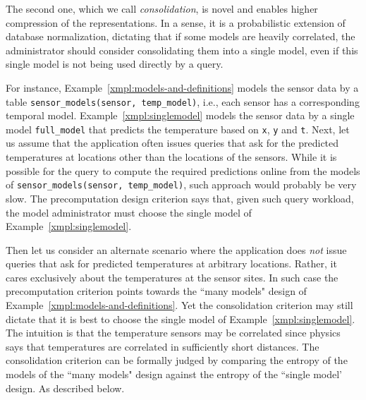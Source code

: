 The second one, which we call {\em consolidation}, is novel and enables higher compression of the representations. In a sense, it is a probabilistic extension of database normalization, dictating that if some models are heavily correlated, the administrator should consider consolidating them into a single model, even if this single model is not being used directly by a query. 

\begin{example}
\label{xmpl:design-choices}
For instance, Example~\ref{xmpl:models-and-definitions} models the sensor data by a table \texttt{sensor\_models(sensor, temp\_model)}, i.e., each sensor has a corresponding temporal model. Example~\ref{xmpl:singlemodel} models the sensor data by a single model \texttt{full\_model} that predicts the temperature based on \texttt{x}, \texttt{y} and \texttt{t}. Next, let us assume that the application often issues queries that ask for the predicted temperatures at locations other than the locations of the sensors. While it is possible for the query to compute the required predictions online from the models of  \texttt{sensor\_models(sensor, temp\_model)}, such approach would probably be very slow. The precomputation design criterion says that, given such query workload, the model administrator must choose the single model of Example~\ref{xmpl:singlemodel}.

Then let us consider an alternate scenario where the application does {\em not} issue queries that ask for predicted temperatures at arbitrary locations. Rather, it cares exclusively about the temperatures at the sensor sites. In such case the precomputation criterion points towards the ``many models" design of Example~\ref{xmpl:models-and-definitions}. Yet the consolidation criterion may still dictate that it is best to choose the single model of Example~\ref{xmpl:singlemodel}. The intuition is that the temperature sensors may be correlated since physics says that temperatures are correlated in sufficiently short distances. The consolidation criterion can be formally judged by comparing the entropy of the models of the ``many models" design against the entropy of the ``single model' design. As described below.
\end{example}



